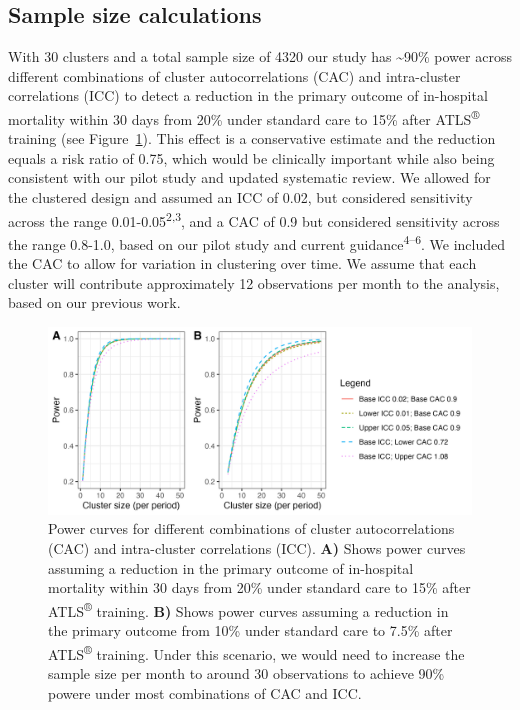 \documentclass[
]{scrartcl}
\begin{document}
\hypertarget{sample-size-calculations}{%
\subsection{Sample size calculations}\label{sample-size-calculations}}

With 30 clusters and a total sample size of 4320 our study has
\textasciitilde90\% power across different combinations of cluster
autocorrelations (CAC) and intra-cluster correlations (ICC) to detect a
reduction in the primary outcome of in-hospital mortality within 30 days
from 20\% under standard care to 15\% after ATLS\textsuperscript{®}
training (see Figure~\ref{fig-power-curves}). This effect is a
conservative estimate and the reduction equals a risk ratio of 0.75,
which would be clinically important while also being consistent with our
pilot study and updated systematic review. We allowed for the clustered
design and assumed an ICC of 0.02, but considered sensitivity across the
range 0.01-0.05\textsuperscript{2,3}, and a CAC of 0.9 but considered
sensitivity across the range 0.8-1.0, based on our pilot study and
current guidance\textsuperscript{4--6}. We included the CAC to allow for
variation in clustering over time. We assume that each cluster will
contribute approximately 12 observations per month to the analysis,
based on our previous work.

\begin{figure}

{\centering \includegraphics{./combined-power-curves.png}

}

\caption{\label{fig-power-curves}Power curves for different combinations
of cluster autocorrelations (CAC) and intra-cluster correlations (ICC).
\textbf{A)} Shows power curves assuming a reduction in the primary
outcome of in-hospital mortality within 30 days from 20\% under standard
care to 15\% after ATLS\textsuperscript{®} training. \textbf{B)} Shows
power curves assuming a reduction in the primary outcome from 10\% under
standard care to 7.5\% after ATLS\textsuperscript{®} training. Under
this scenario, we would need to increase the sample size per month to
around 30 observations to achieve 90\% powere under most combinations of
CAC and ICC.}

\end{figure}
\end{document}
